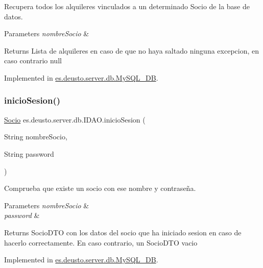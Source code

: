 Recupera todos los alquileres vinculados a un determinado Socio de la base de datos. 
\begin{DoxyParams}{Parameters}
{\em nombre\+Socio} & \\
\hline
\end{DoxyParams}
\begin{DoxyReturn}{Returns}
Lista de alquileres en caso de que no haya saltado ninguna excepcion, en caso contrario null 
\end{DoxyReturn}


Implemented in \mbox{\hyperlink{classes_1_1deusto_1_1server_1_1db_1_1_my_s_q_l___d_b_a8759ef6481a9fbab8ee3cad5a99abbc9}{es.\+deusto.\+server.\+db.\+My\+S\+Q\+L\+\_\+\+DB}}.

\mbox{\label{interfacees_1_1deusto_1_1server_1_1db_1_1_i_d_a_o_a5ec0443a5c196f3545f89c3716450e42}} 
\subsubsection{\texorpdfstring{inicioSesion()}{inicioSesion()}}
{\footnotesize\ttfamily \mbox{\hyperlink{classes_1_1deusto_1_1client_1_1data_1_1_socio}{Socio}} es.\+deusto.\+server.\+db.\+I\+D\+A\+O.\+inicio\+Sesion (\begin{DoxyParamCaption}\item[{String}]{nombre\+Socio,  }\item[{String}]{password }\end{DoxyParamCaption})}

Comprueba que existe un socio con ese nombre y contraseña. 
\begin{DoxyParams}{Parameters}
{\em nombre\+Socio} & \\
\hline
{\em password} & \\
\hline
\end{DoxyParams}
\begin{DoxyReturn}{Returns}
Socio\+D\+TO con los datos del socio que ha iniciado sesion en caso de hacerlo correctamente. En caso contrario, un Socio\+D\+TO vacio 
\end{DoxyReturn}


Implemented in \mbox{\hyperlink{classes_1_1deusto_1_1server_1_1db_1_1_my_s_q_l___d_b_a2af44018d93fc4b14ddbb3e4bdd8bf05}{es.\+deusto.\+server.\+db.\+My\+S\+Q\+L\+\_\+\+DB}}.

